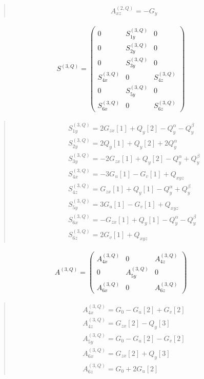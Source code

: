 \documentclass[fleqn,10pt]{jsarticle}
\begin{document}
\begin{quote}
\begin{align*}
& A^{(2,Q)}_{xz} = - G_{y}
\end{align*}
\end{quote}
\begin{align*}
S^{(3,Q)} = \begin{pmatrix} 0 & S^{(3,Q)}_{1y} & 0 \\ 0 & S^{(3,Q)}_{2y} & 0 \\ 0 & S^{(3,Q)}_{3y} & 0 \\ S^{(3,Q)}_{4x} & 0 & S^{(3,Q)}_{4z} \\ 0 & S^{(3,Q)}_{5y} & 0 \\ S^{(3,Q)}_{6x} & 0 & S^{(3,Q)}_{6z} \end{pmatrix}
\end{align*}
\begin{quote}
\begin{align*}
& S^{(3,Q)}_{1y} = 2 G_{zx}[1] + Q_{y}[2] - Q_{y}^{\alpha} - Q_{y}^{\beta} \\
& S^{(3,Q)}_{2y} = 2 Q_{y}[1] + Q_{y}[2] + 2 Q_{y}^{\alpha} \\
& S^{(3,Q)}_{3y} = - 2 G_{zx}[1] + Q_{y}[2] - Q_{y}^{\alpha} + Q_{y}^{\beta} \\
& S^{(3,Q)}_{4x} = - 3 G_{u}[1] - G_{v}[1] + Q_{xyz} \\
& S^{(3,Q)}_{4z} = G_{zx}[1] + Q_{y}[1] - Q_{y}^{\alpha} + Q_{y}^{\beta} \\
& S^{(3,Q)}_{5y} = 3 G_{u}[1] - G_{v}[1] + Q_{xyz} \\
& S^{(3,Q)}_{6x} = - G_{zx}[1] + Q_{y}[1] - Q_{y}^{\alpha} - Q_{y}^{\beta} \\
& S^{(3,Q)}_{6z} = 2 G_{v}[1] + Q_{xyz}
\end{align*}
\end{quote}
\begin{align*}
A^{(3,Q)} = \begin{pmatrix} A^{(3,Q)}_{4x} & 0 & A^{(3,Q)}_{4z} \\ 0 & A^{(3,Q)}_{5y} & 0 \\ A^{(3,Q)}_{6x} & 0 & A^{(3,Q)}_{6z} \end{pmatrix}
\end{align*}
\begin{quote}
\begin{align*}
& A^{(3,Q)}_{4x} = G_{0} - G_{u}[2] + G_{v}[2] \\
& A^{(3,Q)}_{4z} = G_{zx}[2] - Q_{y}[3] \\
& A^{(3,Q)}_{5y} = G_{0} - G_{u}[2] - G_{v}[2] \\
& A^{(3,Q)}_{6x} = G_{zx}[2] + Q_{y}[3] \\
& A^{(3,Q)}_{6z} = G_{0} + 2 G_{u}[2]
\end{align*}
\end{quote}
\end{document}

